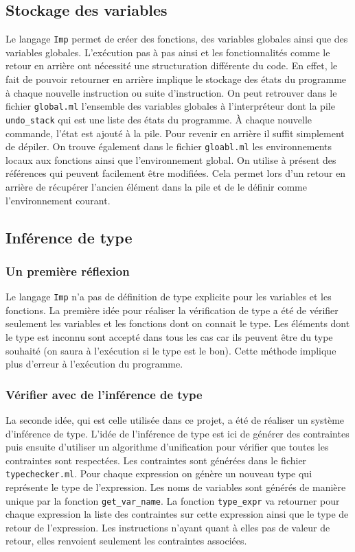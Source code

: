 \documentclass{article}
\begin{document}
\subsection{Stockage des variables}
\label{store_var}
Le langage \texttt{Imp} permet de créer des fonctions, des variables globales ainsi 
que des variables globales. L'exécution pas à pas ainsi et les fonctionnalités comme 
le retour en arrière ont nécessité une structuration différente du code. En effet, 
le fait de pouvoir retourner en arrière implique le stockage des états du programme 
à chaque nouvelle instruction ou suite d'instruction. On peut retrouver dans le 
fichier \texttt{global.ml} l'ensemble des variables globales à l'interpréteur 
dont la pile \texttt{undo\_stack} qui est une liste des états du programme. À chaque 
nouvelle commande, l'état est ajouté à la pile. Pour revenir en arrière il suffit 
simplement de dépiler. On trouve également dans le fichier \texttt{gloabl.ml} les 
environnements locaux aux fonctions ainsi que l'environnement global. On utilise à 
présent des références qui peuvent facilement être modifiées. Cela permet lors d'un 
retour en arrière de récupérer l'ancien élément dans la pile et de le définir 
comme l'environnement courant.


\subsection{Inférence de type}
\subsubsection{Un première réflexion}
Le langage \texttt{Imp} n'a pas de définition de type explicite pour les variables 
et les fonctions. La première idée pour réaliser la vérification de type a été 
de vérifier seulement les variables et les fonctions dont on connait le type. 
Les éléments dont le type est inconnu sont accepté dans tous les cas car ils 
peuvent être du type souhaité (on saura à l'exécution si le type est le bon). 
Cette méthode implique plus d'erreur à l'exécution du programme.

\subsubsection{Vérifier avec de l'inférence de type}
La seconde idée, qui est celle utilisée dans ce projet, a été de réaliser un 
système d'inférence de type. L'idée de l'inférence de type est ici de 
générer des contraintes puis ensuite d'utiliser un algorithme d'unification 
pour vérifier que toutes les contraintes sont respectées. Les contraintes 
sont générées dans le fichier \texttt{typechecker.ml}.
Pour chaque expression on génère un nouveau type qui représente le type de 
l'expression. Les noms de variables sont générés de manière unique par 
la fonction \texttt{get\_var\_name}. La fonction \texttt{type\_expr} va 
retourner pour chaque expression la liste des contraintes sur cette 
expression ainsi que le type de retour de l'expression. Les instructions 
n'ayant quant à elles pas de valeur de retour, elles renvoient seulement 
les contraintes associées.
\end{document}
